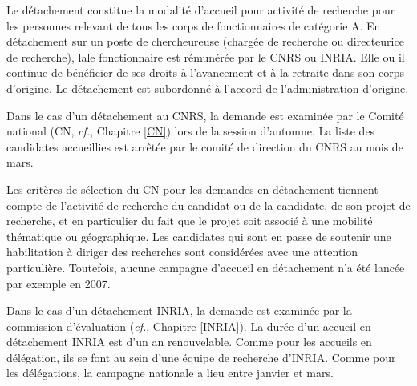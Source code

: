 Le d\'etachement constitue la modalit\'e d'accueil pour activit\'e
de recherche pour les personnes relevant de tous les corps de
fonctionnaires de cat\'egorie A. En d\'etachement sur un poste de
chercheur\mp euse (charg\'e\mp e de recherche ou directeur\mp ice de recherche), la\mp le
fonctionnaire est r\'emun\'er\'e\mp e par le CNRS ou INRIA. Elle ou il continue
de b\'en\'eficier de ses droits \`a l'avancement et \`a la retraite
dans son corps d'origine. Le d\'etachement est subordonn\'e \`a
l'accord de l'administration d'origine.

Dans le cas d'un d\'etachement au CNRS, la demande est examin\'ee
par le Comit\'e national (CN, {\em cf.}, Chapitre \ref{CN}) lors de la session
d'automne. La liste des candidat\mp e\mp s accueilli\mp e\mp s est arr\^et\'ee par le
comit\'e de direction du CNRS au mois de mars.

Les crit\`eres de s\'election du CN pour les demandes en
d\'etachement tiennent compte de l'activit\'e de recherche du
candidat ou de la candidate, de son projet de recherche, et en particulier du fait que
le projet soit associ\'e \`a une mobilit\'e th\'ematique ou
g\'eographique. Les candidat\mp e\mp s qui sont en passe de soutenir une
habilitation \`a diriger des recherches sont consid\'er\'e\mp e\mp s avec une
attention particuli\`ere. Toutefois, aucune campagne d'accueil en
d\'etachement n'a \'et\'e lanc\'ee par exemple en 2007.

Dans le cas d'un d\'etachement INRIA, la demande est
examin\'ee par la commission d'\'evaluation ({\em cf.}, Chapitre \ref{INRIA}).
La dur\'ee d'un accueil en d\'etachement INRIA est d'un an
renouvelable. Comme pour les accueils en d\'el\'egation, ils se font
au sein d'une \'equipe de recherche d'INRIA. Comme pour les d\'el\'egations,
la campagne nationale a lieu entre janvier et mars.


